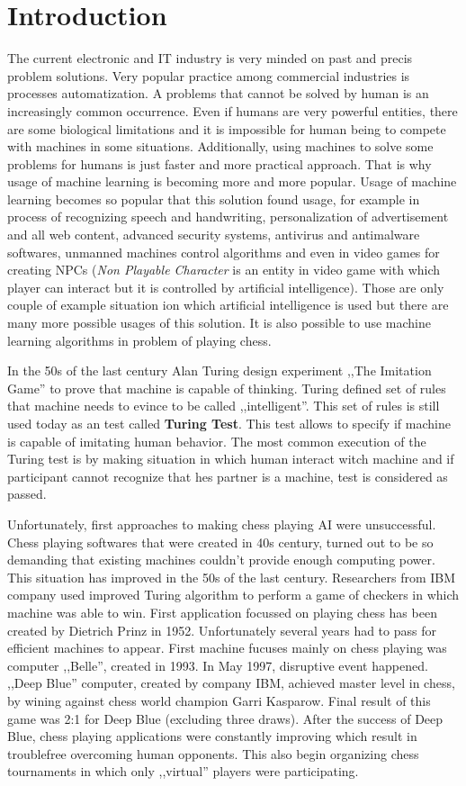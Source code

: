 \chapter{Introduction}
The current electronic and IT industry is very minded on past and precis problem solutions. Very popular practice among commercial industries is processes automatization. A problems that cannot be solved by human is an increasingly common occurrence. Even if humans are very powerful entities, there are some biological limitations and it is impossible for human being to compete with machines in some situations. Additionally, using machines to solve some problems for humans is just faster and more practical approach. That is why usage of machine learning is becoming more and more popular. Usage of machine learning becomes so popular that this solution found usage, for example in process of recognizing speech and handwriting, personalization of advertisement and all web content, advanced security systems, antivirus and antimalware softwares, unmanned machines control algorithms and even in video games for creating NPCs (\textit{Non Playable Character} is an entity in video game with which player can interact but it is controlled by artificial intelligence). Those are only couple of example situation ion which artificial intelligence is used but there are many more possible usages of this solution. It is also possible to use machine learning algorithms in problem of playing chess.

In the 50s of the last century Alan Turing design experiment ,,The Imitation Game'' to prove that machine is capable of thinking. Turing defined set of rules that machine needs to evince to be called ,,intelligent''. This set of rules is still used today as an test called \textbf{Turing Test}. This test allows to specify if machine is capable of imitating human behavior. The most common execution of the Turing test is by making situation in which human interact witch machine and if participant cannot recognize that hes partner is a machine, test is considered as passed. 

Unfortunately, first approaches to making chess playing AI were unsuccessful. Chess playing softwares that were created in 40s century, turned out to be so demanding that existing machines couldn't provide enough computing power. This situation has improved in the 50s of the last century. Researchers from IBM company used improved Turing algorithm to perform a game of checkers in which machine was able to win. First application focussed on playing chess has been created by Dietrich Prinz in 1952. Unfortunately several years had to pass for efficient machines to appear. First machine fucuses mainly on chess playing was computer ,,Belle'', created in 1993. In May 1997, disruptive event happened. ,,Deep Blue'' computer, created by company IBM, achieved master level in chess, by wining against chess world champion Garri Kasparow. Final result of this game was 2:1 for Deep Blue (excluding three draws). After the success of Deep Blue, chess playing applications were constantly improving which result in troublefree overcoming human opponents. This also begin organizing chess tournaments in which only ,,virtual'' players were participating.

